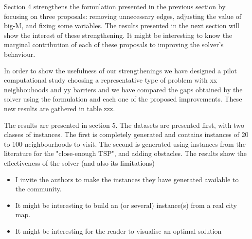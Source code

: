 \documentclass{article}
\newenvironment{reviewer}{\setcounter{pointcounter}{1}}{}
\newcommand{\point}{\text{{\selectfont \thepointcounter} \stepcounter{pointcounter}}}
\begin{document}
\begin{reviewer}
{		\begin{tcolorbox}[breakable,enhanced,coltitle=black,colback=green!5!white,colframe=green!75!black,title=\textbf{Answer R2.\point},borderline={1pt}{0pt}{black},boxrule=0pt]
			
		\end{tcolorbox}
}
		
		\begin{itshape}
			Section 4 strengthens the formulation presented in the previous section by focusing on three proposals: removing unnecessary edges, adjusting the value of big-M, and fixing some variables. The results presented in the next section will show the interest of these strengthening. It might be interesting to know the marginal contribution of each of these proposals to improving the solver's behaviour.
		\end{itshape}
		
		\begin{tcolorbox}[breakable,enhanced,coltitle=black,colback=green!5!white,colframe=green!75!black,title=\textbf{Answer R2.\point},borderline={1pt}{0pt}{black},boxrule=0pt]
			In order to show the usefulness of our strengthenings we have designed a pilot computational study choosing a representative type of problem with xx neighbouhoods and yy barriers and we have compared the gaps obtained by the solver using the formulation and each one of the proposed improvements. These new results are gathered in table zzz.
		\end{tcolorbox}
		
		\begin{itshape}
			The results are presented in section 5. The datasets are presented first, with two classes of instances. The first is completely generated and contains instances of 20 to 100 neighbourhoods to visit. The second is generated using instances from the literature for the "close-enough TSP", and adding obstacles. The results show the effectiveness of the solver (and also its limitations)
			\begin{itemize}
			\item I invite the authors to make the instances they have generated available to the community.
			\item It might be interesting to build an (or several) instance(s) from a real city map.
			\item It might be interesting for the reader to visualise an optimal solution
			\end{itemize}
		\end{itshape}
		

\end{reviewer}
\end{document}
